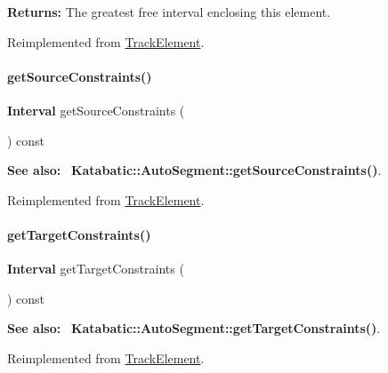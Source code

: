 {\bfseries Returns\+:} The greatest free interval enclosing this element. 

Reimplemented from \hyperlink{classKite_1_1TrackElement_a034711e2d3617ea848ef9f5a18255e10}{Track\+Element}.

\mbox{\label{classKite_1_1TrackSegment_a48f8b54f9489da3778d85c382a483f81}} 
\paragraph{\texorpdfstring{get\+Source\+Constraints()}{getSourceConstraints()}}
{\footnotesize\ttfamily \textbf{ Interval} get\+Source\+Constraints (\begin{DoxyParamCaption}{ }\end{DoxyParamCaption}) const\hspace{0.3cm}{\ttfamily [virtual]}}

{\bfseries See also\+:}~ \textbf{ Katabatic\+::\+Auto\+Segment\+::get\+Source\+Constraints()}. 

Reimplemented from \hyperlink{classKite_1_1TrackElement_a48f8b54f9489da3778d85c382a483f81}{Track\+Element}.

\mbox{\label{classKite_1_1TrackSegment_a69af7d4287bc0e44c9ca2c8e6f692be9}} 
\paragraph{\texorpdfstring{get\+Target\+Constraints()}{getTargetConstraints()}}
{\footnotesize\ttfamily \textbf{ Interval} get\+Target\+Constraints (\begin{DoxyParamCaption}{ }\end{DoxyParamCaption}) const\hspace{0.3cm}{\ttfamily [virtual]}}

{\bfseries See also\+:}~ \textbf{ Katabatic\+::\+Auto\+Segment\+::get\+Target\+Constraints()}. 

Reimplemented from \hyperlink{classKite_1_1TrackElement_a69af7d4287bc0e44c9ca2c8e6f692be9}{Track\+Element}.


